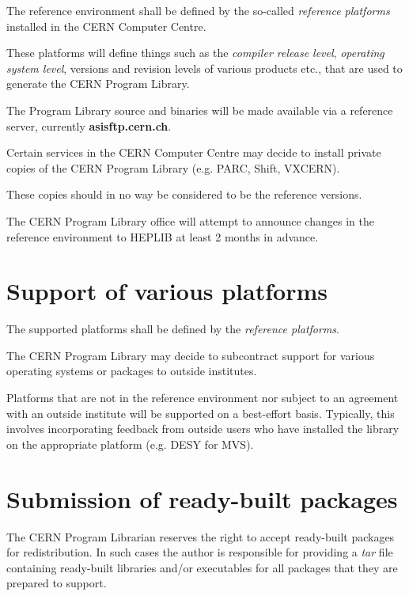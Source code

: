 The reference environment shall be defined by the
so-called {\it reference platforms} installed in
the CERN Computer Centre.

These platforms will define things such as the
{\it compiler release level}, {\it operating system level},
versions and revision levels of various products etc.,
that are used to generate the CERN Program Library.

The Program Library source and binaries will be made
available via a reference server, currently {\bf asisftp.cern.ch}.

Certain services in the CERN Computer Centre may decide
to install private copies of the CERN Program Library (e.g.
PARC, Shift, VXCERN).

These copies should in no way be considered to be the reference
versions.

The CERN Program Library office will attempt to announce changes
in the reference environment to HEPLIB at least 2 months in
advance.

\section{Support of various platforms}

The supported platforms shall be defined by the {\it reference platforms}.

The CERN Program Library may decide to subcontract support for
various operating systems or packages to outside institutes.

Platforms that are not in the reference environment nor subject
to an agreement with an outside institute will be supported
on a best-effort basis. Typically, this involves incorporating
feedback from outside users who have installed the library
on the appropriate platform (e.g. DESY for MVS).

\section{Submission of ready-built packages}

The CERN Program Librarian reserves the right to accept
ready-built packages for redistribution. In such cases
the author is responsible for providing a {\it tar} file
containing ready-built libraries and/or executables
for all packages that they are prepared to support.
